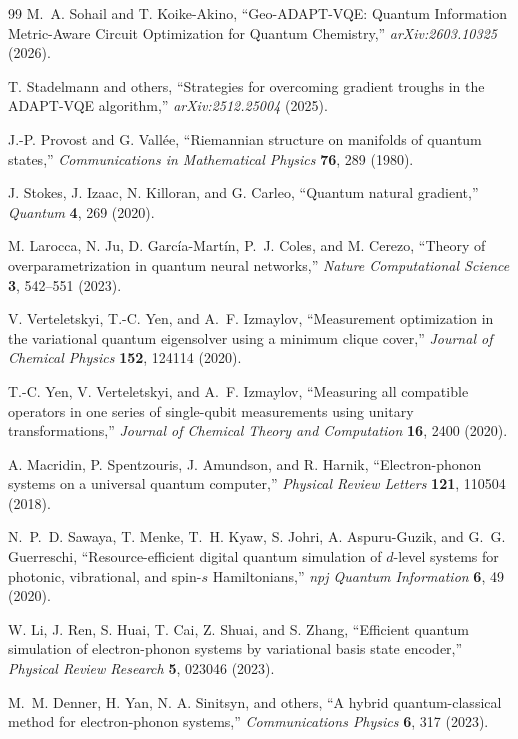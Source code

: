 \documentclass[
  reprint,
  amsmath,
  amssymb,
  aps,
  pra,
  nofootinbib,
  superscriptaddress,
  floatfix
]{revtex4-2}
\begin{document}
\begin{thebibliography}{99}
M.~A. Sohail and T. Koike-Akino,
``Geo-ADAPT-VQE: Quantum Information Metric-Aware Circuit Optimization for Quantum Chemistry,''
\emph{arXiv:2603.10325} (2026).

T. Stadelmann and others,
``Strategies for overcoming gradient troughs in the ADAPT-VQE algorithm,''
\emph{arXiv:2512.25004} (2025).

J.-P. Provost and G. Vall\'ee,
``Riemannian structure on manifolds of quantum states,''
\emph{Communications in Mathematical Physics} \textbf{76}, 289 (1980).

J. Stokes, J. Izaac, N. Killoran, and G. Carleo,
``Quantum natural gradient,''
\emph{Quantum} \textbf{4}, 269 (2020).

M. Larocca, N. Ju, D. Garc{\'i}a-Mart{\'i}n, P.~J. Coles, and M. Cerezo,
``Theory of overparametrization in quantum neural networks,''
\emph{Nature Computational Science} \textbf{3}, 542--551 (2023).

V. Verteletskyi, T.-C. Yen, and A.~F. Izmaylov,
``Measurement optimization in the variational quantum eigensolver using a minimum clique cover,''
\emph{Journal of Chemical Physics} \textbf{152}, 124114 (2020).

T.-C. Yen, V. Verteletskyi, and A.~F. Izmaylov,
``Measuring all compatible operators in one series of single-qubit measurements using unitary transformations,''
\emph{Journal of Chemical Theory and Computation} \textbf{16}, 2400 (2020).


A. Macridin, P. Spentzouris, J. Amundson, and R. Harnik,
``Electron-phonon systems on a universal quantum computer,''
\emph{Physical Review Letters} \textbf{121}, 110504 (2018).

N.~P.~D. Sawaya, T. Menke, T.~H. Kyaw, S. Johri, A. Aspuru-Guzik, and G.~G. Guerreschi,
``Resource-efficient digital quantum simulation of $d$-level systems for photonic, vibrational, and spin-$s$ Hamiltonians,''
\emph{npj Quantum Information} \textbf{6}, 49 (2020).

W. Li, J. Ren, S. Huai, T. Cai, Z. Shuai, and S. Zhang,
``Efficient quantum simulation of electron-phonon systems by variational basis state encoder,''
\emph{Physical Review Research} \textbf{5}, 023046 (2023).

M.~M. Denner, H. Yan, N. A. Sinitsyn, and others,
``A hybrid quantum-classical method for electron-phonon systems,''
\emph{Communications Physics} \textbf{6}, 317 (2023).


\end{thebibliography}
\end{document}
